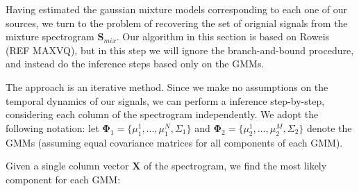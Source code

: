\documentclass[11pt, oneside, a4paper]{report}
\begin{document}
Having estimated the gaussian mixture models 
corresponding to each one of our sources, we turn to the problem of recovering the set of
orignial signals from the mixture spectrogram $\boldsymbol{S}_{mix}$. Our algorithm in this section
is based on Roweis (REF MAXVQ), but in this step we will ignore the branch-and-bound procedure,
and instead do the inference steps based only on the GMMs.

The approach is an iterative method. Since we make no assumptions on the temporal dynamics of
our signals, we can perform a inference step-by-step, considering each column of the spectrogram
independently. We adopt the following notation: let $\boldsymbol{\Phi}_1 = \{ \mu_1^1,...,\mu_1^N, \Sigma_1 \}$
and $\boldsymbol{\Phi}_2 = \{ \mu_2^1,...,\mu_2^M, \Sigma_2 \} $ denote the GMMs (assuming equal covariance
matrices for all components of each GMM).

Given a single column vector $\boldsymbol{X}$ of the spectrogram, we find the 
most likely component for each GMM:
\end{document}
